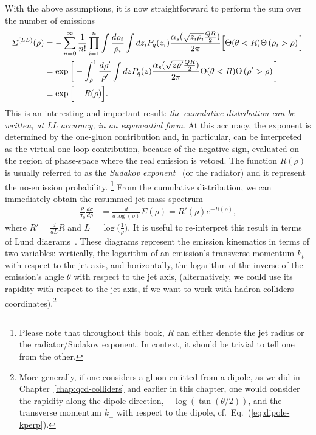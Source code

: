 With the above assumptions, it is now straightforward to perform the
sum over the number of emissions 
  \begin{align}\label{eq:res-mass-cont}
\Sigma^{(LL)}(\rho)&=-\sum_{n=0}^\infty \frac{1}{n!} \prod_{i=1}^n \int \frac{d \rho_i}{\rho_i} \int d z_i P_q(z_i) \frac{\alpha_s(\sqrt{z_i \rho_i} \frac{QR}{2})}{2\pi}
\Big[ \Theta(\theta<R) \Theta \left(\rho_i> \rho \right) \Big]\nonumber
 \\
&= \exp \bigg[ -  \int_\rho^1 \frac{d \rho'}{\rho'} \int d z P_q(z) \frac{\alpha_s(\sqrt{z \rho'}\frac{QR}{2})}{2\pi}
\Theta(\theta<R) \Theta \left(\rho'> \rho \right)\bigg] \nonumber \\ &\equiv \exp \Big [ -R(\rho) \Big].
\end{align}
This is an interesting and important result: {\em the cumulative
  distribution can be written, at LL accuracy, in an exponential
  form}. At this accuracy, the exponent is determined by the one-gluon
contribution and, in particular, can be interpreted as the virtual
one-loop contribution, because of the negative sign, evaluated on the
region of phase-space where the real emission is vetoed. The function
$R(\rho)$ is usually referred to as the {\em Sudakov
  exponent}~\cite{Sudakov:1954sw} (or the radiator) and it represent
the no-emission probability. \footnote{Please note that throughout
  this book, $R$ can either denote the jet radius or the
  radiator/Sudakov exponent. In context, it should be trivial to tell
  one from the other.}
%
From the cumulative distribution, we can immediately obtain the resummed jet mass spectrum
\begin{align} \label{eq:spectrum-res}
\frac{\rho}{\sigma_0}\frac{d \sigma }{d \rho}&= \frac{d}{d \log(\rho)} \Sigma(\rho)= R'(\rho) e^{-R (\rho)},
\end{align}
where $R'= \frac{d}{d L}R$ and $L=\log\big( \frac{1}{\rho}\big)$.
It is useful to re-interpret this result in terms of Lund
diagrams~\cite{Andersson:1988gp}. These diagrams represent the emission kinematics
in terms of two variables: vertically, the logarithm of an emission's
transverse momentum $k_t$ with respect to the jet axis, and
horizontally, the logarithm of the inverse of the emission's angle
$\theta$ with respect to the jet axis, (alternatively, we could use
its rapidity with respect to the jet axis, if we want to work with
hadron colliders coordinates).\footnote{More generally, if one
  considers a gluon emitted from a dipole, as we did in
  Chapter~\ref{chap:qcd-colliders} and earlier in this chapter, one
  would consider the rapidity along the dipole direction,
  $-\log(\tan(\theta/2))$, and the transverse momentum $k_\perp$ with respect to the
  dipole, cf.~Eq.~(\ref{eq:dipole-kperp}).}
